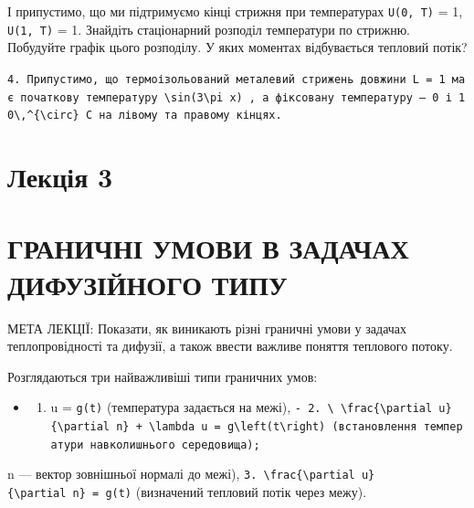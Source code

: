 \documentclass[
  ukrainian,
]{article}
\providecommand{\tightlist}{%
  \setlength{\itemsep}{0pt}\setlength{\parskip}{0pt}}
\begin{document}
І припустимо, що ми підтримуємо кінці стрижня при температурах
\texttt{U(0,\ T)} = 1, \texttt{U(1,\ T)} = 1. Знайдіть стаціонарний
розподіл температури по стрижню. Побудуйте графік цього розподілу. У
яких моментах відбувається тепловий потік?

\texttt{4.\ Припустимо,\ що\ термоізольований\ металевий\ стрижень\ довжини\ L\ =\ 1\ має\ початкову\ температуру\ \textquotesingle{}\textbackslash{}sin(3\textbackslash{}pi\ x)\textquotesingle{}\ ,\ а\ фіксовану\ температуру\ —\ 0\ і\ \textquotesingle{}10\textbackslash{},\^{}\{\textbackslash{}circ\}\textquotesingle{}\ C\ на\ лівому\ та\ правому\ кінцях.}

\section{Лекція 3}\label{ux43bux435ux43aux446ux456ux44f-3}

\section{ГРАНИЧНІ УМОВИ В ЗАДАЧАХ ДИФУЗІЙНОГО
ТИПУ}\label{ux433ux440ux430ux43dux438ux447ux43dux456-ux443ux43cux43eux432ux438-ux432-ux437ux430ux434ux430ux447ux430ux445-ux434ux438ux444ux443ux437ux456ux439ux43dux43eux433ux43e-ux442ux438ux43fux443}

МЕТА ЛЕКЦІЇ: Показати, як виникають різні граничні умови у задачах
теплопровідності та дифузії, а також ввести важливе поняття теплового
потоку.

Розглядаються три найважливіші типи граничних умов:

\begin{itemize}
\tightlist
\item
  \begin{enumerate}
  \def\labelenumi{\arabic{enumi}.}
  \tightlist
  \item
    u = \texttt{g(t)} (температура задається на межі),
    \texttt{-\ \textquotesingle{}2.\ \textbackslash{}\ \textbackslash{}frac\{\textbackslash{}partial\ u\}\{\textbackslash{}partial\ n\}\ +\ \textbackslash{}lambda\ u\ =\ g\textbackslash{}left(t\textbackslash{}right)\textquotesingle{}\ (встановлення\ температури\ навколишнього\ середовища);}
  \end{enumerate}
\end{itemize}

n --- вектор зовнішньої нормалі до межі),
\texttt{3.\ \textbackslash{}frac\{\textbackslash{}partial\ u\}\{\textbackslash{}partial\ n\}\ =\ g(t)}
(визначений тепловий потік через межу).
\end{document}
